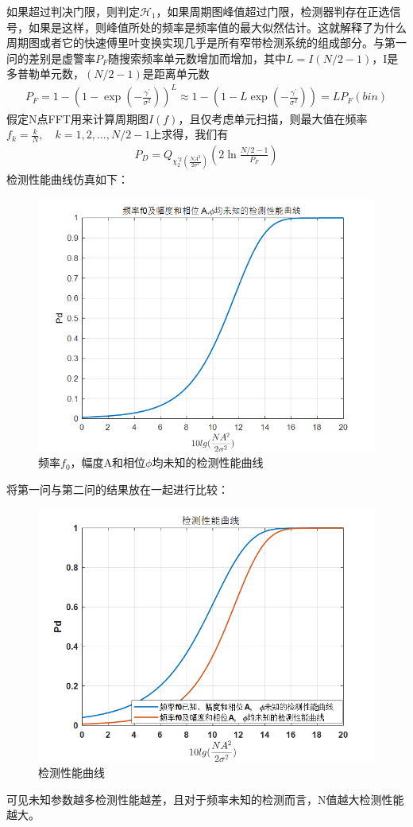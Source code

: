 \documentclass[fontset=windows]{article}
\numberwithin{figure}{section}
\begin{document}
如果超过判决门限，则判定\(\mathcal{H}_1\)，如果周期图峰值超过门限，检测器判存在正选信号，如果是这样，则峰值所处的频率是频率值的最大似然估计。这就解释了为什么周期图或者它的快速傅里叶变换实现几乎是所有窄带检测系统的组成部分。与第一问的差别是虚警率\(P_F\)随搜索频率单元数增加而增加，其中\(L=I(N/2-1)\)，I是多普勒单元数，\((N/2-1)\)是距离单元数
\begin{align*}
    P_F=1-(1-\exp(-\frac{\gamma^{\prime}}{\sigma^2}))^L\approx 1-(1-L\exp(-\frac{\gamma^{\prime}}{\sigma^2}))=LP_F(bin)
\end{align*}
假定N点FFT用来计算周期图\(I(f)\)，且仅考虑单元扫描，则最大值在频率\(f_k=\frac{k}{N},\quad k=1,2,\ldots, N/2-1\)上求得，我们有
\begin{align*}
    P_D=Q_{\chi^{\prime2}_2(\frac{NA^2}{2\sigma^2})}(2\ln \frac{N/2-1}{P_F})
\end{align*}
检测性能曲线仿真如下：

\begin{figure}[H]
    \centering
    \includegraphics[scale=0.7]{4.2.png}
    \caption{频率\(f_0\)，幅度A和相位\(\phi\)均未知的检测性能曲线}
    \label{4.2}
\end{figure}

将第一问与第二问的结果放在一起进行比较：

\begin{figure}[H]
    \centering
    \includegraphics[scale=0.7]{4.3.png}
    \caption{检测性能曲线}
    \label{4.3}
\end{figure}


可见未知参数越多检测性能越差，且对于频率未知的检测而言，N值越大检测性能越大。


\end{document}
